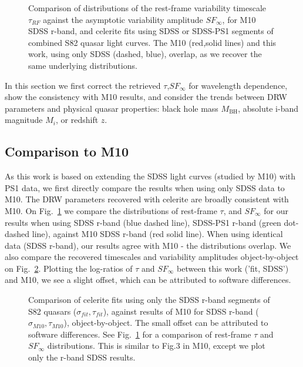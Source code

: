 \documentclass[twocolumn]{aastex62}
\newcommand{\project}[1]{\textsf{#1}}
\begin{document}
\begin{figure} %
\caption{Comparison of distributions of the rest-frame variability timescale $\tau_{RF}$ against the  asymptotic variability amplitude $SF_{\infty}$, for M10 SDSS r-band,  and \project{celerite} fits using  SDSS or SDSS-PS1 segments of combined S82 quasar light curves. The M10 (red,solid lines) and this work, using only SDSS (dashed, blue), overlap, as we recover the same underlying distributions. }
\label{fig:tauRF_SFinf}
\end{figure} 


In this section we first correct  the retrieved $\tau$,$SF_{\infty}$ for wavelength dependence, show the consistency with M10 results,  and consider the trends between DRW parameters and physical quasar properties: black hole mass $M_{\mathrm{BH}}$, absolute i-band  magnitude $M_{i}$, or redshift $z$.  


\subsection{Comparison to M10}
As this work is based on extending the SDSS light curves (studied by M10) with PS1 data, we first directly compare the results when using only SDSS data to M10. The DRW parameters recovered with \project{celerite} are  broadly consistent with M10. On Fig.~\ref{fig:tauRF_SFinf} we compare the distributions of rest-frame $\tau$, and $SF_{\infty}$ for our results when using SDSS  r-band (blue dashed line),  SDSS-PS1 r-band (green dot-dashed line), against  M10 SDSS r-band (red solid line). When using identical data (SDSS r-band), our results agree with M10 - the distributions overlap. We also compare the recovered timescales and variability amplitudes object-by-object on Fig.~\ref{fig:celeriteCompare}.  Plotting the log-ratios of $\tau$ and $SF_{\infty}$ between this work ('fit, SDSS') and M10, we see a slight offset, which can be attributed to software differences. 


\begin{figure} %
\caption{Comparison of \project{celerite} fits using only the  SDSS r-band segments of S82 quasars ($\sigma_{fit}, \tau_{fit}$), against results of M10 for SDSS r-band ($\sigma_{M10}, \tau_{M10}$), object-by-object. The small offset can be attributed to software differences. See Fig.~\ref{fig:tauRF_SFinf} for a comparison of rest-frame $\tau$ and $SF_{\infty}$ distributions. This is similar to Fig.3 in M10, except we plot only the r-band SDSS results.}
\label{fig:celeriteCompare}
\end{figure} 
\end{document}
